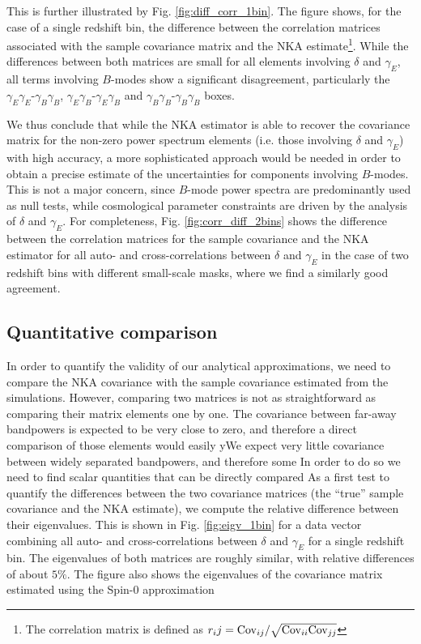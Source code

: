 \documentclass[a4paper,11pt]{article}
\begin{document}
      This is further illustrated by Fig. \ref{fig:diff_corr_1bin}. The figure shows, for the case of a single redshift bin, the difference between the correlation matrices associated with the sample covariance matrix and the NKA estimate\footnote{The correlation matrix is defined as $r_ij = {\rm Cov}_{ij}/\sqrt{{\rm Cov}_{ii}{\rm Cov}_{jj}}$}. While the differences between both matrices are small for all elements involving $\delta$ and $\gamma_E$, all terms involving $B$-modes show a significant disagreement, particularly the  $\gamma_E\gamma_E$-$\gamma_B\gamma_B$, $\gamma_E\gamma_B$-$\gamma_E\gamma_B$ and $\gamma_B\gamma_B$-$\gamma_B\gamma_B$ boxes.

      We thus conclude that while the NKA estimator is able to recover the covariance matrix for the non-zero power spectrum elements (i.e. those involving $\delta$ and $\gamma_E$) with high accuracy, a more sophisticated approach would be needed in order to obtain a precise estimate of the uncertainties for components involving $B$-modes. This is not a major concern, since $B$-mode power spectra are predominantly used as null tests, while cosmological parameter constraints are driven by the analysis of $\delta$ and $\gamma_E$. For completeness, Fig. \ref{fig:corr_diff_2bins} shows the difference between the correlation matrices for the sample covariance and the NKA estimator for all auto- and cross-correlations between $\delta$ and $\gamma_E$ in the case of two redshift bins with different small-scale masks, where we find a similarly good agreement.

    \subsection{Quantitative comparison}\label{ssec:results.quant}
      In order to quantify the validity of our analytical approximations, we need to compare the NKA covariance with the sample covariance estimated from the simulations. However, comparing two matrices is not as straightforward as comparing their matrix elements one by one. The covariance between far-away bandpowers is expected to be very close to zero, and therefore a direct comparison of those elements would easily yWe expect very little covariance between widely separated bandpowers, and therefore some  In order to do so we need to find scalar quantities that can be directly compared 
      As a first test to quantify the differences between the two covariance matrices (the ``true'' sample covariance and the NKA estimate), we compute the relative difference between their eigenvalues. This is shown in Fig. \ref{fig:eigv_1bin} for a data vector combining all auto- and cross-correlations between $\delta$ and $\gamma_E$ for a single redshift bin. The eigenvalues of both matrices are roughly similar, with relative differences of about $5\%$. The figure also shows the eigenvalues of the covariance matrix estimated using the Spin-0 approximation
      
\end{document}
